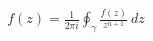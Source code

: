 \documentclass[preview]{standalone}
\begin{document}
\begin{align*}
[z^n]f(z) = \frac{1}{2\pi i}\oint_{\gamma} \frac{f(z)}{z^{n+1}}~dz
\end{align*}
\end{document}

